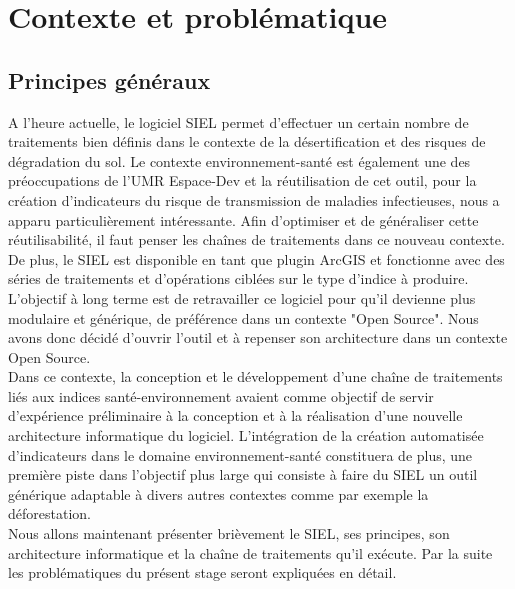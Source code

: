 \chapter{Contexte et problématique}



\section{Principes généraux}



A l'heure actuelle, le logiciel SIEL permet d'effectuer un certain nombre de traitements bien définis dans le contexte de la désertification et des risques de dégradation du sol. Le contexte environnement-santé est également une des préoccupations de l'UMR Espace-Dev et la réutilisation de cet outil, pour la création d'indicateurs du risque de transmission de maladies infectieuses, nous a apparu particulièrement intéressante. Afin d'optimiser et de généraliser cette réutilisabilité, il faut penser les chaînes de traitements dans ce nouveau contexte. \\

De plus, le SIEL est disponible en tant que plugin ArcGIS  et fonctionne avec des séries de traitements et d'opérations ciblées sur le type d'indice à produire. L'objectif à long terme est de retravailler ce logiciel pour qu'il devienne plus modulaire et générique, de préférence dans un contexte "Open Source". Nous avons donc décidé d'ouvrir l'outil et à repenser son architecture dans un contexte Open Source. \\

Dans ce contexte, la conception et le développement d'une chaîne de traitements liés aux indices santé-environnement avaient comme objectif de servir d'expérience préliminaire à la conception et à la réalisation d'une nouvelle architecture informatique du logiciel. %
L'intégration de la création automatisée d'indicateurs dans le domaine environnement-santé constituera de plus, une première piste dans l'objectif plus large qui consiste à faire du SIEL un outil générique adaptable à divers autres contextes comme par exemple la déforestation.\\

Nous allons maintenant présenter brièvement le SIEL, ses principes, son architecture informatique et la chaîne de traitements qu'il exécute. Par la suite les problématiques du présent stage seront expliquées en détail.\\



